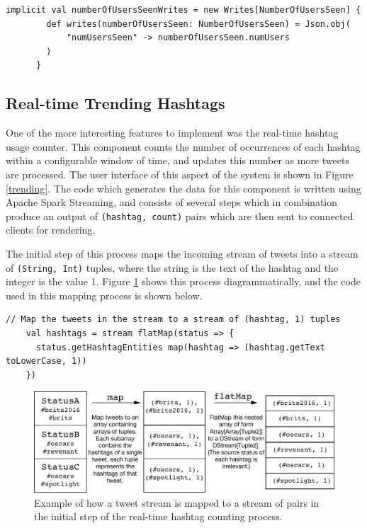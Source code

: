 \documentclass{l4proj}
\newcommand{\code}[1]{\texttt{#1}}
\begin{document}
    \begin{lstlisting}[caption=Code for conversion of the NumberOfUsersSeen Scala case class to JSON format.]
      implicit val numberOfUsersSeenWrites = new Writes[NumberOfUsersSeen] {
        def writes(numberOfUsersSeen: NumberOfUsersSeen) = Json.obj(
            "numUsersSeen" -> numberOfUsersSeen.numUsers
        )
      }
    \end{lstlisting}

\subsection{Real-time Trending Hashtags}

One of the more interesting features to implement was the real-time hashtag usage counter. This component counts the number of occurrences of each hashtag within a configurable window of time, and updates this number as more tweets are processed. The user interface of this aspect of the system is shown in Figure \ref{trending}. The code which generates the data for this component is written using Apache Spark Streaming, and consists of several steps which in combination produce an output of \code{(hashtag, count)} pairs which are then sent to connected clients for rendering.

The initial step of this process maps the incoming stream of tweets into a stream of \code{(String, Int)} tuples, where the string is the text of the hashtag and the integer is the value 1. Figure \ref{mappingstep} shows this process diagrammatically, and the code used in this mapping process is shown below.

\begin{lstlisting}[caption=Initial mapping of tweets to hashtags pairs.]
    // Map the tweets in the stream to a stream of (hashtag, 1) tuples
    val hashtags = stream flatMap(status => {
      status.getHashtagEntities map(hashtag => (hashtag.getText toLowerCase, 1))
    })
\end{lstlisting}

\begin{figure}
\centering
\includegraphics[scale=0.75]{mappingstep.pdf}
\caption{Example of how a tweet stream is mapped to a stream of pairs in the initial step of the real-time hashtag counting process.}
\label{mappingstep}
\end{figure}
               
\end{document}
